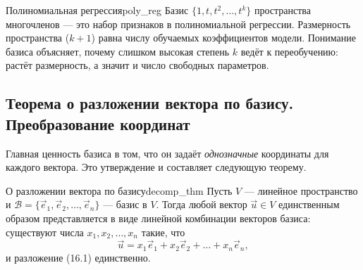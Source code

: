 \documentclass[12pt,a4paper]{article}
\begin{document}
\begin{remarkIT}{Полиномиальная регрессия}{poly_reg}
  Базис $\{1, t, t^2, \dots, t^k\}$ пространства многочленов --- это
  набор признаков в полиномиальной регрессии. Размерность пространства
  ($k+1$) равна числу обучаемых коэффициентов модели. Понимание базиса
  объясняет, почему слишком высокая степень $k$ ведёт к переобучению:
  растёт размерность, а значит и число свободных параметров.
\end{remarkIT}

\subsection*{Теорема о разложении вектора по базису.
Преобразование координат}

Главная ценность базиса в том, что он задаёт \emph{однозначные}
координаты для каждого вектора. Это утверждение и составляет следующую
теорему.

\begin{theorem}{О разложении вектора по базису}{decomp_thm}
  Пусть $V$ --- линейное пространство и $\mathcal{B} = \{\vec{e}_1,
  \vec{e}_2, \dots, \vec{e}_n\}$ --- базис в $V$. Тогда любой вектор
  $\vec{u} \in V$ единственным образом представляется в виде линейной
  комбинации векторов базиса: существуют числа $x_1, x_2, \dots, x_n$
  такие, что
  \begin{equation}
    \vec{u} = x_1\vec{e}_1 + x_2\vec{e}_2 + \dots + x_n\vec{e}_n,
    \tag{16.1}
  \end{equation}
  и разложение (16.1) единственно.
\end{theorem}
\end{document}
